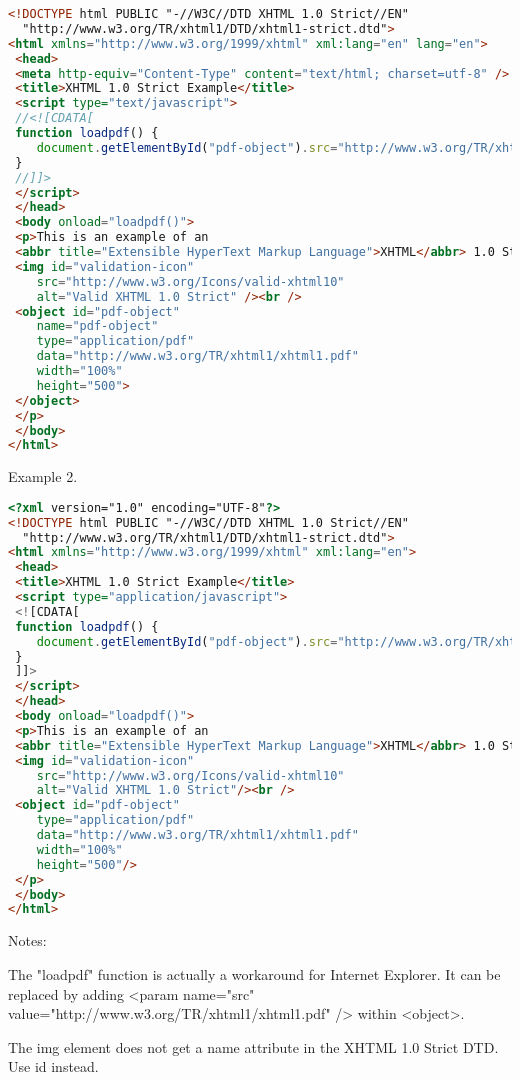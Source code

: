 \begin{lstlisting}[language=HTML]
<!DOCTYPE html PUBLIC "-//W3C//DTD XHTML 1.0 Strict//EN"
  "http://www.w3.org/TR/xhtml1/DTD/xhtml1-strict.dtd">
<html xmlns="http://www.w3.org/1999/xhtml" xml:lang="en" lang="en">
 <head>
 <meta http-equiv="Content-Type" content="text/html; charset=utf-8" />
 <title>XHTML 1.0 Strict Example</title>
 <script type="text/javascript">
 //<![CDATA[
 function loadpdf() {
    document.getElementById("pdf-object").src="http://www.w3.org/TR/xhtml1/xhtml1.pdf";
 }
 //]]>
 </script>
 </head>
 <body onload="loadpdf()">
 <p>This is an example of an
 <abbr title="Extensible HyperText Markup Language">XHTML</abbr> 1.0 Strict document.<br />
 <img id="validation-icon"
    src="http://www.w3.org/Icons/valid-xhtml10"
    alt="Valid XHTML 1.0 Strict" /><br />
 <object id="pdf-object"
    name="pdf-object"
    type="application/pdf"
    data="http://www.w3.org/TR/xhtml1/xhtml1.pdf"
    width="100%"
    height="500">
 </object>
 </p>
 </body>
</html>
\end{lstlisting}

Example 2.

\begin{lstlisting}[language=HTML]
<?xml version="1.0" encoding="UTF-8"?>
<!DOCTYPE html PUBLIC "-//W3C//DTD XHTML 1.0 Strict//EN"
  "http://www.w3.org/TR/xhtml1/DTD/xhtml1-strict.dtd">
<html xmlns="http://www.w3.org/1999/xhtml" xml:lang="en">
 <head>
 <title>XHTML 1.0 Strict Example</title>
 <script type="application/javascript">
 <![CDATA[
 function loadpdf() {
    document.getElementById("pdf-object").src="http://www.w3.org/TR/xhtml1/xhtml1.pdf";
 }
 ]]>
 </script>
 </head>
 <body onload="loadpdf()">
 <p>This is an example of an
 <abbr title="Extensible HyperText Markup Language">XHTML</abbr> 1.0 Strict document.<br/>
 <img id="validation-icon"
    src="http://www.w3.org/Icons/valid-xhtml10"
    alt="Valid XHTML 1.0 Strict"/><br />
 <object id="pdf-object"
    type="application/pdf"
    data="http://www.w3.org/TR/xhtml1/xhtml1.pdf"
    width="100%"
    height="500"/>
 </p>
 </body>
</html>
\end{lstlisting}


Notes:

\begin{compactenum}
\item The "loadpdf" function is actually a workaround for Internet Explorer. It can be replaced by adding <param name="src" value="http://www.w3.org/TR/xhtml1/xhtml1.pdf" /> within <object>.
\item The img element does not get a name attribute in the XHTML 1.0 Strict DTD. Use id instead.
\end{compactenum}




